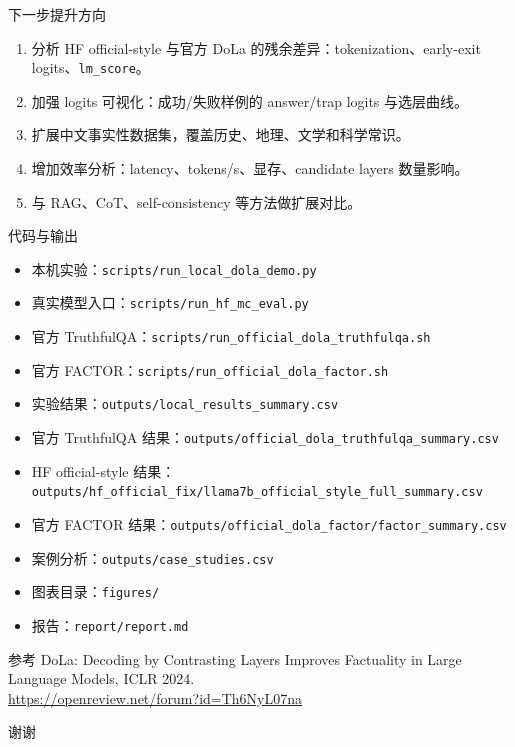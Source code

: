 \documentclass[aspectratio=169,11pt]{ctexbeamer}
\newcommand{\code}[1]{\texttt{\small #1}}
\begin{document}
\begin{frame}{下一步提升方向}
  \begin{enumerate}
    \item 分析 HF official-style 与官方 DoLa 的残余差异：tokenization、early-exit logits、\code{lm\_score}。
    \item 加强 logits 可视化：成功/失败样例的 answer/trap logits 与选层曲线。
    \item 扩展中文事实性数据集，覆盖历史、地理、文学和科学常识。
    \item 增加效率分析：latency、tokens/s、显存、candidate layers 数量影响。
    \item 与 RAG、CoT、self-consistency 等方法做扩展对比。
  \end{enumerate}
\end{frame}

\begin{frame}{代码与输出}
  \scriptsize
  \begin{itemize}
    \item 本机实验：\code{scripts/run\_local\_dola\_demo.py}
    \item 真实模型入口：\code{scripts/run\_hf\_mc\_eval.py}
    \item 官方 TruthfulQA：\code{scripts/run\_official\_dola\_truthfulqa.sh}
    \item 官方 FACTOR：\code{scripts/run\_official\_dola\_factor.sh}
    \item 实验结果：\code{outputs/local\_results\_summary.csv}
    \item 官方 TruthfulQA 结果：\code{outputs/official\_dola\_truthfulqa\_summary.csv}
    \item HF official-style 结果：\code{outputs/hf\_official\_fix/llama7b\_official\_style\_full\_summary.csv}
    \item 官方 FACTOR 结果：\code{outputs/official\_dola\_factor/factor\_summary.csv}
    \item 案例分析：\code{outputs/case\_studies.csv}
    \item 图表目录：\code{figures/}
    \item 报告：\code{report/report.md}
  \end{itemize}

  \vspace{0.2em}
  \begin{block}{参考}
    DoLa: Decoding by Contrasting Layers Improves Factuality in Large Language Models, ICLR 2024.\\
    \url{https://openreview.net/forum?id=Th6NyL07na}
  \end{block}
\end{frame}

\begin{frame}
  \centering
  \Huge 谢谢
\end{frame}
\end{document}
